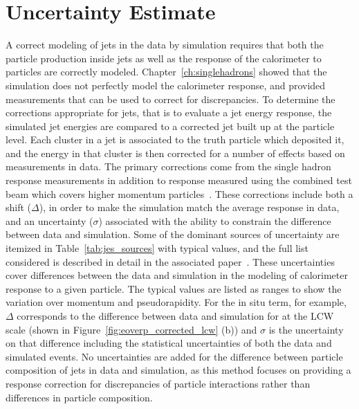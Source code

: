 \section{Uncertainty Estimate}

A correct modeling of jets in the data by simulation requires that both the particle production inside jets as well as the response of the calorimeter to particles are correctly modeled.
Chapter~\ref{ch:singlehadrons} showed that the simulation does not perfectly model the calorimeter response, and provided measurements that can be used to correct for discrepancies.
To determine the corrections appropriate for jets, that is to evaluate a jet energy response, the simulated jet energies are compared to a corrected jet built up at the particle level.
Each cluster in a jet is associated to the truth particle which deposited it, and the energy in that cluster is then corrected for a number of effects based on measurements in data. 
The primary corrections come from the single hadron response measurements in addition to response measured using the combined test beam which covers higher momentum particles~\cite{CTB}.
These corrections include both a shift ($\Delta$), in order to make the simulation match the average response in data, and an uncertainty ($\sigma$) associated with the ability to constrain the difference between data and simulation.
Some of the dominant sources of uncertainty are itemized in Table~\ref{tab:jes_sources} with typical values, and the full list considered is described in detail in the associated paper~\cite{PERF-2015-05}. 
These uncertainties cover differences between the data and simulation in the modeling of calorimeter response to a given particle.
The typical values are listed as ranges to show the variation over momentum and pseudorapidity.
For the in situ \ep term, for example, $\Delta$ corresponds to the difference between data and simulation for \epcor at the \ac{LCW} scale (shown in Figure~\ref{fig:eoverp_corrected_lcw} (b)) and $\sigma$ is the uncertainty on that difference including the statistical uncertainties of both the data and simulated events.
No uncertainties are added for the difference between particle composition of jets in data and simulation, as this method focuses on providing a response correction for discrepancies of particle interactions rather than differences in particle composition.



